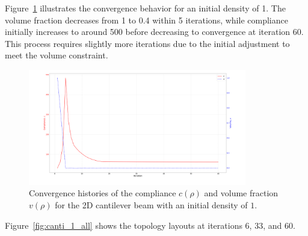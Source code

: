 \documentclass[mathpazo]{cicp}
\begin{document}
Figure~\ref{fig:canti_1_convergence} illustrates the convergence behavior for an initial density of 1. The volume fraction decreases from 1 to 0.4 within 5 iterations, while compliance initially increases to around 500 before decreasing to convergence at iteration 60. This process requires slightly more iterations due to the initial adjustment to meet the volume constraint.

\vspace{-2ex} %
\begin{figure}[htp]
	\centering
	\includegraphics[width=0.85\textwidth]{figures/cantilever_2d_1_convergence.png}
	\caption{Convergence histories of the compliance $c(\rho)$ and volume fraction $v(\rho)$ for the 2D cantilever beam with an initial density of $1$.}
	\label{fig:canti_1_convergence}
\end{figure}
\vspace{-2ex} %

Figure~\ref{fig:canti_1_all} shows the topology layouts at iterations 6, 33, and 60.
\end{document}
